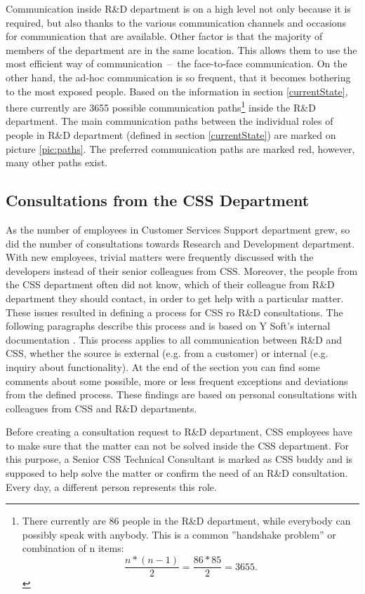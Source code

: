 \documentclass[11pt,singleside]{myfithesis2}
\begin{document}
Communication inside R\&D department is on a high level not only because it is required, but also thanks to the various communication channels and occasions for communication that are available. Other factor is that the majority of members of the department are in the same location. This allows them to use the most efficient way of communication~--~the face-to-face communication. On the other hand, the ad-hoc communication is so frequent, that it becomes bothering to the most exposed people. Based on the information in section \ref{currentState}, there currently are 3655 possible communication paths\footnote{There currently are 86 people in the R\&D department, while everybody can possibly speak with anybody. This is a common ''handshake problem'' or combination of n items:
\begin{equation}
	\frac{n*(n-1)}{2}=\frac{86*85}{2}=3655.
\end{equation} } inside the R\&D department. The main communication paths between the individual roles of people in R\&D department (defined in section \ref{currentState}) are marked on picture \ref{pic:paths}. The preferred communication paths are marked red, however, many other paths exist.

			
		\subsection{Consultations from the CSS Department}\label{cssConsult}
As the number of employees in Customer Services Support department grew, so did the number of consultations towards Research and Development department. With new employees, trivial matters were frequently discussed with the developers instead of their senior colleagues from CSS. Moreover, the people from the CSS department often did not know, which of their colleague from R\&D department they should contact, in order to get help with a particular matter. These issues resulted in defining a process for CSS ro R\&D consultations. The following paragraphs describe this process and is based on Y Soft's internal documentation \cite{ysoftInternal}. This process applies to all communication between R\&D and CSS, whether the source is external (e.g. from a customer) or internal (e.g. inquiry about functionality). At the end of the section you can find some comments about some possible, more or less frequent exceptions and deviations from the defined process. These findings are based on personal consultations with colleagues from CSS and R\&D departments.

Before creating a consultation request to R\&D department, CSS employees have to make sure that the matter can not be solved inside the CSS department. For this purpose, a Senior CSS Technical Consultant is marked as CSS buddy and is supposed to help solve the matter or confirm the need of an R\&D consultation. Every day, a different person represents this role.
\end{document}
